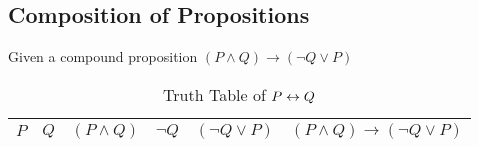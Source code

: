 \subsection{Composition of Propositions}
\begin{example}
    Given a compound proposition $(P \land Q) \to (\lnot Q \lor P)$
\end{example}

\begin{table}[htb]
    \centering
    \begin{tabular}[t]{llllll}
        \toprule
        $P$ & $Q$ & $(P \land Q)$ & $\lnot Q$ & $(\lnot Q \lor P)$ & $(P \land Q) \to (\lnot Q \lor P)$ \\
        \midrule
        
        \bottomrule
    \end{tabular}
    
    \caption{Truth Table of $P \leftrightarrow Q$}
    \label{table:truth_table_composition}
\end{table}